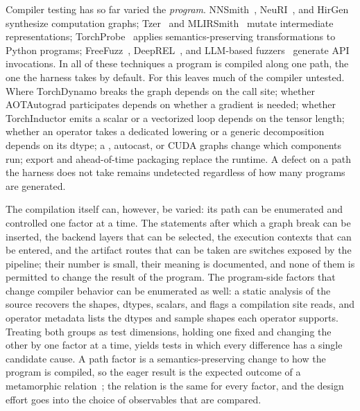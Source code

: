 Compiler testing has so far varied the \emph{program}. NNSmith~\cite{DBLP:conf/asplos/LiuLRTLPZ23}, NeuRI~\cite{DBLP:conf/sigsoft/0004PW023},
and HirGen~\cite{DBLP:conf/issta/MaS00C23} synthesize computation graphs; Tzer~\cite{DBLP:journals/pacmpl/LiuWYDZ22} and
MLIRSmith~\cite{DBLP:conf/kbse/WangCXLWSZ23} mutate intermediate representations; TorchProbe~\cite{DBLP:conf/aplas/SuGPS23} applies
semantics-preserving transformations to Python programs; FreeFuzz~\cite{DBLP:conf/icse/WeiDYZ22},
DeepREL~\cite{DBLP:conf/sigsoft/DengYWZ22}, and LLM-based fuzzers~\cite{DBLP:conf/issta/DengXPY023,DBLP:conf/icse/DengXYZY024} generate API
invocations. In all of these techniques a program is compiled along one path, the one the harness takes by
default. For \tcompile this leaves much of the compiler untested. Where TorchDynamo breaks the graph depends on
the call site; whether AOTAutograd participates depends on whether a gradient is needed; whether TorchInductor
emits a scalar or a vectorized loop depends on the tensor length; whether an operator takes a dedicated lowering
or a generic decomposition depends on its dtype; a , autocast, or CUDA graphs change
which components run; export and ahead-of-time packaging replace the runtime. A defect on a path the harness
does not take remains undetected regardless of how many programs are generated.

The compilation itself can, however, be varied: its path can be enumerated and controlled one factor at a time. The statements after
which a graph break can be inserted, the backend layers that can be selected, the execution contexts that can
be entered, and the artifact routes that can be taken are switches exposed by the pipeline; their number is
small, their meaning is documented, and none of them is permitted to change the result of the program. The
program-side factors that change compiler behavior can be enumerated as well: a static analysis of the source
recovers the shapes, dtypes, scalars, and flags a compilation site reads, and operator metadata lists the dtypes
and sample shapes each operator supports. Treating both groups as test dimensions, holding one fixed and
changing the other by one factor at a time, yields tests in which every difference has a single candidate cause.
A path factor is a semantics-preserving change to how the program is compiled, so the eager result is the
expected outcome of a metamorphic relation~\cite{DBLP:journals/csur/ChenKLPTTZ18}; the relation is the same for
every factor, and the design effort goes into the choice of observables that are compared.

